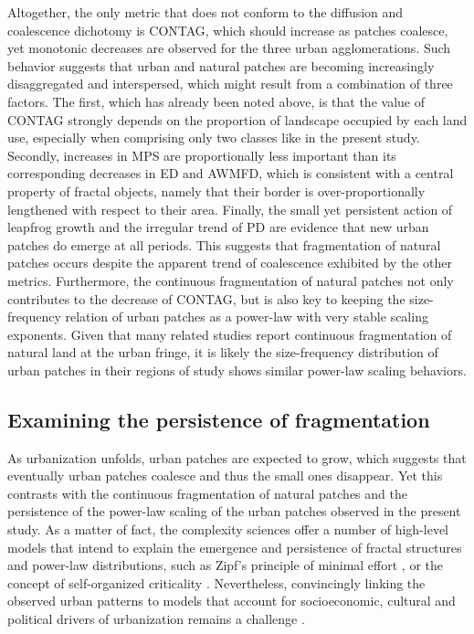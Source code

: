 Altogether, the only metric that does not conform to the diffusion and coalescence dichotomy is CONTAG, which should increase as patches coalesce, yet monotonic decreases are observed for the three urban agglomerations. Such behavior suggests that urban and natural patches are becoming increasingly disaggregated and interspersed, which might result from a combination of three factors.
The first, which has already been noted above, is that the value of CONTAG strongly depends on the proportion of landscape occupied by each land use, especially when comprising only two classes like in the present study.
Secondly, increases in MPS are proportionally less important than its corresponding decreases in ED and AWMFD, which is consistent with a central property of fractal objects, namely that their border is over-proportionally lengthened with respect to their area.
Finally, the small yet persistent action of leapfrog growth and the irregular trend of PD are evidence that new urban patches do emerge at all periods.
This suggests that fragmentation of natural patches occurs despite the apparent trend of coalescence exhibited by the other metrics.
Furthermore, the continuous fragmentation of natural patches not only contributes to the decrease of CONTAG, but is also key to keeping the size-frequency relation of urban patches as a power-law with very stable scaling exponents.
Given that many related studies report continuous fragmentation of natural land at the urban fringe, it is likely the size-frequency distribution of urban patches in their regions of study shows similar power-law scaling behaviors.


\subsection*{Examining the persistence of fragmentation}

As urbanization unfolds, urban patches are expected to grow, which suggests that eventually urban patches coalesce and thus the small ones disappear. Yet this contrasts with the continuous fragmentation of natural patches and the persistence of the power-law scaling of the urban patches observed in the present study.
As a matter of fact, the complexity sciences offer a number of high-level models that intend to explain the emergence and persistence of fractal structures and power-law distributions, such as Zipf's principle of minimal effort \citep{zipf1949human}, or the concept of self-organized criticality \citep{bak1988self}.
Nevertheless, convincingly linking the observed urban patterns to models that account for socioeconomic, cultural and political drivers of urbanization remains a challenge \citep{batty2001modelling, manson2006complexity, bosch2019addressing}. 

